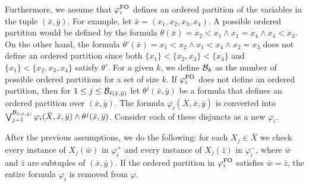 Furthermore, we assume that $\varphi_i^{{\rm FO}}$ defines an ordered partition of the variables in the tuple $(\bar{x},\bar{y})$. For example, let $\bar{x} = (x_1,x_2,x_3,x_4)$. A possible ordered partition would be defined by the formula $\theta(\bar{x}) = x_2 < x_1 \wedge x_1 = x_4 \wedge x_4 < x_3$. On the other hand, the formula $\theta'(\bar{x}) = x_1 < x_2 \wedge x_1 < x_4 \wedge x_2 = x_3$ does not define an ordered partition since both $\{x_1\}<\{x_2,x_3\}<\{x_4\}$ and $\{x_1\} < \{x_2,x_3,x_4\}$ satisfy $\theta'$.
For a given $k$, we define $\mathcal{B}_k$ as the number of possible ordered partitions for a set of size $k$. 
If $\varphi_i^{{\rm FO}}$ does not define an ordered partition, then for $1 \leq j \leq \mathcal{B}_{\ell(\bar{x},\bar{y})}$ 
let $\theta^j(\bar{x},\bar{y})$ be a formula that defines an ordered partition over $(\bar{x},\bar{y})$. The formula $\varphi_i(\bar{X},\bar{x},\bar{y})$ is converted into $\bigvee_{j = 1}^{\mathcal{B}_{\ell(\bar{x},\bar{y})}}\varphi_i(\bar{X},\bar{x},\bar{y}) \wedge \theta^j(\bar{x},\bar{y})$. Consider each of these disjuncts as a new $\varphi_i$.

After the previous assumptions, we do the following: for each $X_j\in \bar{X}$ we check every instance of $X_j(\bar{w})$ in $\varphi^{+}_i$ and every instance of $X_j(\bar{z})$ in $\varphi^{-}_i$, where $\bar{w}$ and $\bar{z}$ are subtuples of $(\bar{x},\bar{y})$. If the ordered partition in $\varphi^{{\rm FO}}_i$ satisfies $\bar{w} = \bar{z}$, the entire formula $\varphi_i$ is removed from $\varphi$.

